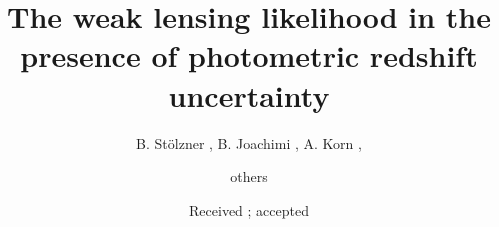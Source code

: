 \documentclass{aa}
\begin{document}
 

   \title{The weak lensing likelihood in the presence of photometric redshift uncertainty}


   \author{B. St\"olzner
             ,
             B. Joachimi
             ,
             A. Korn
             ,
          \and
          others
          }


   \date{Received ; accepted }



   \maketitle
%
\end{document}
